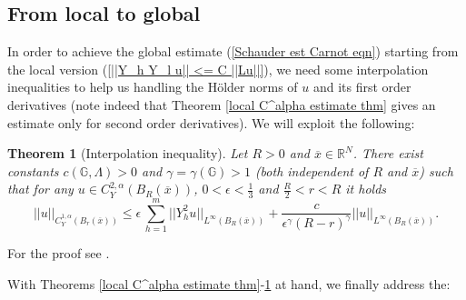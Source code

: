 \documentclass{article}
\newtheorem{theorem}{Theorem}[section]
\numberwithin{equation}{section}
\begin{document}
\vspace{5mm}

\subsection{From local to global}
In order to achieve the global estimate (\ref{Schauder est Carnot eqn}) starting from the local version (\ref{||Y_h Y_l u|| <= C ||Lu||}), we need some interpolation inequalities to help us handling the Hölder norms of $u$ and its first order derivatives (note indeed that Theorem \ref{local C^alpha estimate thm} gives an estimate only for second order derivatives). We will exploit the following:

\vspace{2mm}

\begin{theorem}[Interpolation inequality]
    \label{Real interp ineq thm}
    Let $R>0$ and $\overline{x} \in \mathbb{R}^N$. There exist constants $c(\mathbb{G}, \Lambda)>0$ and $\gamma=\gamma(\mathbb{G})>1$ (both independent of $R$ and $\overline{x}$) such that for any $u \in C^{2,\alpha}_Y(B_R(\overline{x}))$, $0 < \epsilon < \frac{1}{3}$ and $\frac{R}{2}<r<R$ it holds
    \begin{equation*}
        ||u||_{C^{1,\alpha}_Y(B_r(\overline{x}))} \leq \epsilon \, \sum_{h=1}^m ||Y_h^2 u||_{L^{\infty}(B_R(\overline{x}))} + \frac{c}{\epsilon^\gamma (R-r)^{\gamma}} ||u||_{L^{\infty}(B_R(\overline{x}))}.
    \end{equation*}
\end{theorem}

\vspace{2mm}

\hspace{-7mm} For the proof see \cite[Proposition 8.56]{librone}.

With Theorems \ref{local C^alpha estimate thm}-\ref{Real interp ineq thm} at hand, we finally address the:

\vspace{2mm}
\end{document}

